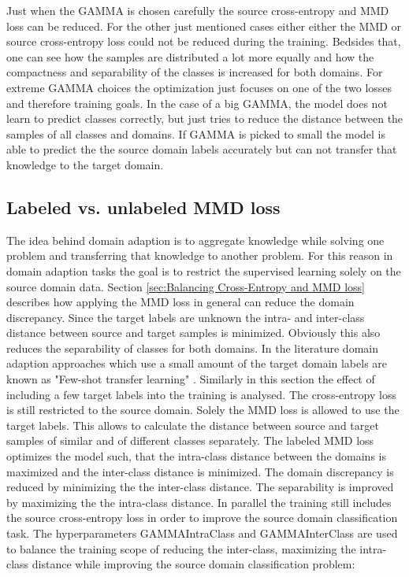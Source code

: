Just when the GAMMA is chosen carefully the source cross-entropy and MMD loss can be reduced. For the other just mentioned cases either either the MMD or source cross-entropy loss could not be reduced during the training. Bedsides that, one can see how the samples are distributed a lot more equally and how the compactness and separability of the classes is increased for both domains. For extreme GAMMA choices the optimization just focuses on one of the two losses and therefore training goals. In the case of a big GAMMA, the model does not learn to predict classes correctly, but just tries to reduce the distance between the samples of all classes and domains. If GAMMA is picked to small the model is able to predict the the source domain labels accurately but can not transfer that knowledge to the target domain. 

\subsection{Labeled vs. unlabeled MMD loss} \label{sec:Differences of labeled and unlabeled MMD loss}

The idea behind domain adaption is to aggregate knowledge while solving one problem and transferring that knowledge to another problem. For this reason in domain adaption tasks the goal is to restrict the supervised learning solely on the source domain data. Section \ref{sec:Balancing Cross-Entropy and MMD loss} describes how applying the MMD loss in general can reduce the domain discrepancy. Since the target labels are unknown the intra- and inter-class distance between source and target samples is minimized. Obviously this also reduces the separability of classes for both domains. In the literature domain adaption approaches which use a small amount of the target domain labels are known as "Few-shot transfer learning" \cite{WU2020}. Similarly in this section the effect of including a few target labels into the training is analysed. The cross-entropy loss is still restricted to the source domain. Solely the MMD loss is allowed to use the target labels. This allows to calculate the distance between source and target samples of similar and of different classes separately. The labeled MMD loss optimizes the model such, that the intra-class distance between the domains is maximized and the inter-class distance is minimized. The domain discrepancy is reduced by minimizing the the inter-class distance. The separability is improved by maximizing the the intra-class distance. In parallel the training still includes the source cross-entropy loss in order to improve the source domain classification task. The hyperparameters GAMMAIntraClass and GAMMAInterClass are used to balance the training scope of reducing the inter-class, maximizing the intra-class distance while improving the source domain classification problem:

